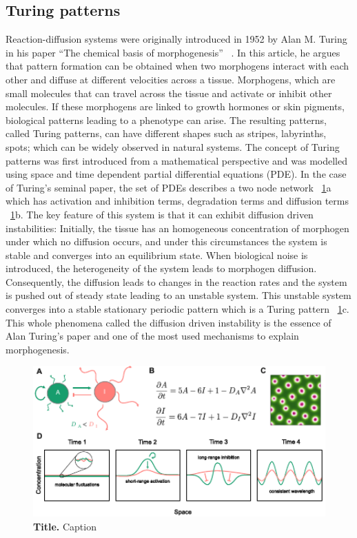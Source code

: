 \subsection{Turing patterns}
Reaction-diffusion systems were originally introduced in 1952 by Alan M. Turing in his paper “The chemical basis of morphogenesis” ~\parencite{Turing1952}.
In this article, he argues that pattern formation can be obtained when two morphogens interact with each other and diffuse at different
velocities across a tissue.
Morphogens, which are small molecules that can travel across the tissue and activate or inhibit other molecules.
If these morphogens are linked to growth hormones or skin pigments, biological patterns leading to a phenotype can arise.
The resulting patterns, called Turing patterns, can have different shapes such as stripes, labyrinths, spots; which can be widely observed in natural systems.
The concept of Turing patterns was first introduced from a mathematical perspective and was modelled using space and time dependent partial differential equations (PDE). In the case of Turing’s seminal paper, the set of PDEs describes a two node network ~\ref{fig:intro_to_turing_patterns}a which has activation and inhibition terms, degradation terms and diffusion terms ~\ref{fig:intro_to_turing_patterns}b.
The key feature of this system is that it can exhibit diffusion driven instabilities: Initially, the tissue has an homogeneous concentration of morphogen under which no diffusion occurs, and under this circumstances the system is stable and converges into an equilibrium state.
When biological noise is introduced, the heterogeneity of the system leads to morphogen diffusion.
Consequently, the diffusion leads to changes in the reaction rates and the system is pushed out of steady state leading to an unstable system.
This unstable system converges into a stable stationary periodic pattern which is a Turing pattern ~\ref{fig:intro_to_turing_patterns}c.
This whole phenomena called the diffusion driven instability is the essence of Alan Turing’s paper and one of the most used mechanisms to explain morphogenesis.

\begin{figure}[h!]
    \centering
    \includegraphics[width=1\textwidth]{chapters/Introduction/intro_to_turing_patterns}
    \caption{\textbf{Title.} Caption}
    \label{fig:intro_to_turing_patterns}
\end{figure}


